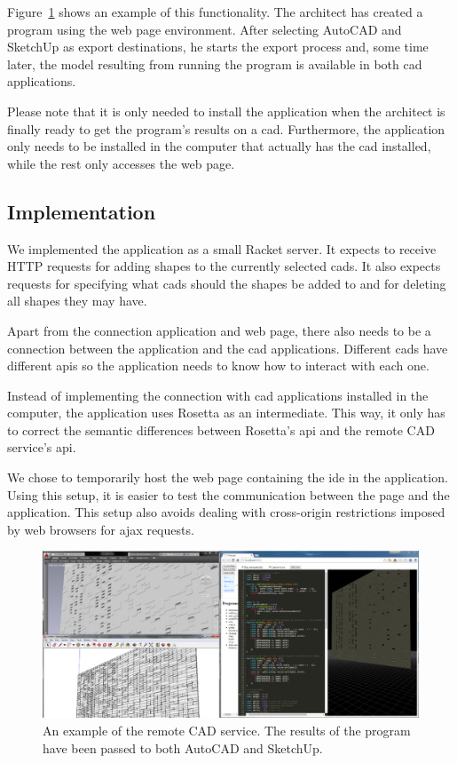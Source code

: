 Figure~\ref{fig:remote:cad:example} shows an example of this functionality.
The architect has created a program using the web page environment.
After selecting AutoCAD and SketchUp as export destinations, he starts the export process and, some time later, the model resulting from running the program is available in both \gls{cad} applications.

Please note that it is only needed to install the application when the architect is finally ready to get the program's results on a \gls{cad}.
Furthermore, the application only needs to be installed in the computer that actually has the \gls{cad} installed, while the rest only accesses the web page.


\subsection{Implementation}
We implemented the application as a small Racket server.
It expects to receive HTTP requests for adding shapes to the currently selected \glspl{cad}.
It also expects requests for specifying what \glspl{cad} should the shapes be added to and for deleting all shapes they may have.

Apart from the connection application and web page, there also needs to be a connection between the application and the \gls{cad} applications.
Different \glspl{cad} have different \glspl{api} so the application needs to know how to interact with each one.

Instead of implementing the connection with \gls{cad} applications installed in the computer, the application uses Rosetta as an intermediate.
This way, it only has to correct the semantic differences between Rosetta's \gls{api} and the remote CAD service's \gls{api}.

We chose to temporarily host the web page containing the \gls{ide} in the application.
Using this setup, it is easier to test the communication between the page and the application.
This setup also avoids dealing with cross-origin restrictions imposed by web browsers for \gls{ajax} requests.

\begin{figure}
  \centering
  \includegraphics[width=1.0\textwidth]{./images/remote_cad_example}
  \caption[An example of the remote CAD service.]{An example of the remote CAD service. The results of the program have been passed to both AutoCAD and SketchUp.}
  \label{fig:remote:cad:example}
\end{figure}


